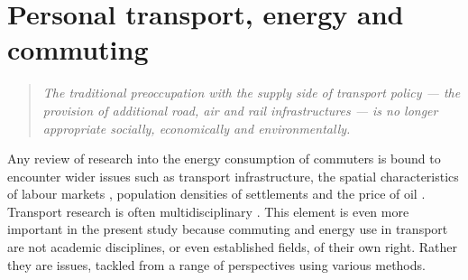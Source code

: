 \documentclass[a4paper, 11pt, twoside]{Thesis}
\begin{document}
 
\chapter{Personal transport, energy and commuting}
\label{Chapter2}
\fancyhead[RE,LO]{\thepage}

\begin{quote}
\textit{The traditional preoccupation with the supply side of transport policy
---
the provision of additional road, air and rail infrastructures --- is no longer
appropriate socially, economically and environmentally.}
\end{quote}

Any review of research into the energy consumption of commuters is bound to
encounter wider issues such as transport infrastructure,
the spatial characteristics of labour markets \citep{Ballas2006}, population
densities of settlements \citep{Breheny1995}
and the price of oil \citep{Sexton2011}. Transport research is often
multidisciplinary \citep{Hoyle1992modern}. This element is even more important in
the present study because
commuting and energy use in transport are not academic disciplines, or even
established fields, of their own right. Rather they are issues, tackled from a
range of perspectives using various methods. 
\end{document}
